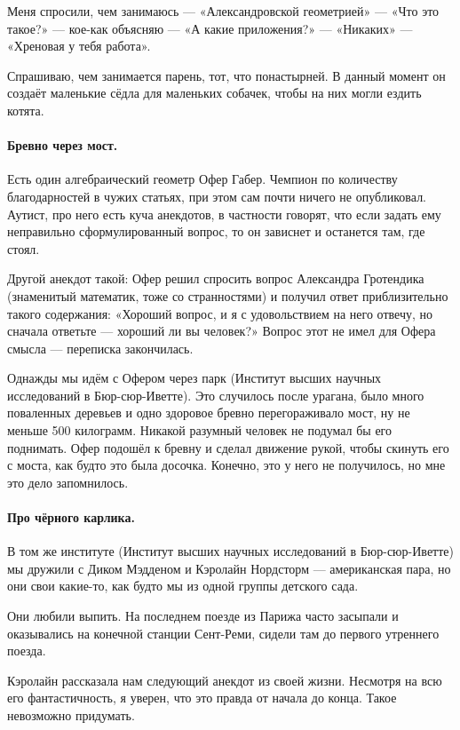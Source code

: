 \documentclass{book}
\begin{document}
Меня спросили, чем занимаюсь --- «Александровской геометрией» --- «Что это такое?» --- кое-как объясняю --- «А какие приложения?» --- «Никаких» --- «Хреновая у тебя работа».

Спрашиваю, чем занимается парень, тот, что понастырней.
В данный момент он создаёт маленькие сёдла для маленьких собачек, чтобы на них могли ездить котята.

\paragraph{Бревно через мост.}
Есть один алгебраический геометр Офер Габер.
Чемпион по количеству благодарностей в чужих статьях, при этом сам почти ничего не опубликовал.
Аутист, про него есть куча анекдотов, в частности говорят, что если задать ему неправильно сформулированный вопрос, то он зависнет и останется там, где стоял.

Другой анекдот такой: Офер решил спросить вопрос Александра Гротендика (знаменитый математик, тоже со странностями) и получил ответ приблизительно такого содержания: «Хороший вопрос, и я с удовольствием на него отвечу, но сначала ответьте --- хороший ли вы человек?»
Вопрос этот не имел для Офера смысла --- переписка закончилась.

Однажды мы идём с Офером через парк (Институт высших научных исследований в Бюр-сюр-Иветте).
Это случилось после урагана, было много поваленных деревьев и одно здоровое бревно перегораживало мост,
ну не меньше 500 килограмм.
Никакой разумный человек не подумал бы его поднимать.
Офер подошёл к бревну и сделал движение рукой, чтобы скинуть его с моста, как будто это была досочка.
Конечно, это у него не получилось, но мне это дело запомнилось.

\paragraph{Про чёрного карлика.}
В том же институте (Институт высших научных исследований в Бюр-сюр-Иветте) мы дружили с  
Диком Мэдденом и Кэролайн Нордсторм --- американская пара, но они свои какие-то, как будто мы из одной группы детского сада.

Они любили выпить.
На последнем поезде из Парижа часто засыпали и оказывались на конечной станции Сент-Реми, сидели там до первого утреннего поезда.

{\sloppy

Кэролайн рассказала нам следующий анекдот из своей жизни.
Несмотря на всю его фантастичность, я уверен, что это правда от начала до конца.
Такое невозможно придумать.

}
\end{document}
